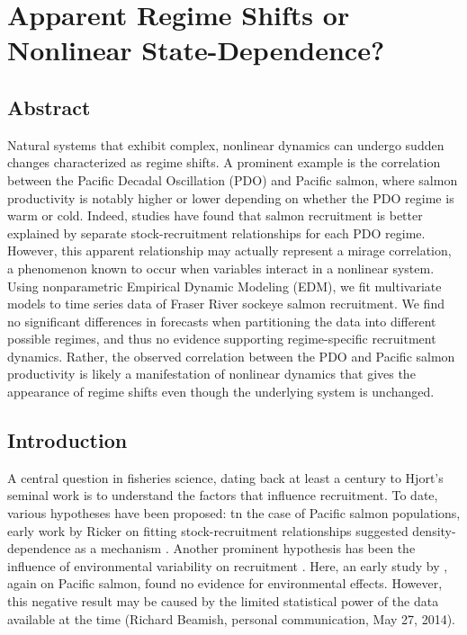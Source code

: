 \chapter{Apparent Regime Shifts or Nonlinear State-Dependence?}
\label{chap_salmon_regimes}

\section{Abstract}
Natural systems that exhibit complex, nonlinear dynamics can undergo sudden changes characterized as regime shifts. A prominent example is the correlation between the Pacific Decadal Oscillation (PDO) and Pacific salmon, where salmon productivity is notably higher or lower depending on whether the PDO regime is warm or cold. Indeed, studies have found that salmon recruitment is better explained by separate stock-recruitment relationships for each PDO regime. However, this apparent relationship may actually represent a mirage correlation, a phenomenon known to occur when variables interact in a nonlinear system. Using nonparametric Empirical Dynamic Modeling (EDM), we fit  multivariate models to time series data of Fraser River sockeye salmon recruitment. We find no significant differences in forecasts when partitioning the data into different possible regimes, and thus no evidence supporting regime-specific recruitment dynamics. Rather, the observed correlation between the PDO and Pacific salmon productivity is likely a manifestation of nonlinear dynamics that gives the appearance of regime shifts even though the underlying system is unchanged.

\section{Introduction}

A central question in fisheries science, dating back at least a century to Hjort's seminal work \cite{Hjort_1914} is to understand the factors that influence recruitment. To date, various hypotheses have been proposed: tn the case of Pacific salmon populations, early work by Ricker on fitting stock-recruitment relationships suggested density-dependence as a mechanism \cite{Ricker_1954}. Another prominent hypothesis has been the influence of environmental variability on recruitment \cite{Cushing_1982}. Here, an early study by \cite{Ricker_1958}, again on Pacific salmon, found no evidence for environmental effects. However, this negative result may be caused by the limited statistical power of the data available at the time (Richard Beamish, personal communication, May 27, 2014).

